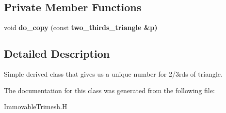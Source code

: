 \subsection*{Private Member Functions}
\begin{CompactItemize}
\item 
void \textbf{do\_\-copy} (const \bf{two\_\-thirds\_\-triangle} \&p)\label{classSimSite3D_1_1geometry_1_1two__thirds__triangle_590f608270791925a9e65210cd3bcc26}

\end{CompactItemize}


\subsection{Detailed Description}
Simple derived class that gives us a unique number for 2/3rds of triangle. 



The documentation for this class was generated from the following file:\begin{CompactItemize}
\item 
Immovable\-Trimesh.H\end{CompactItemize}
